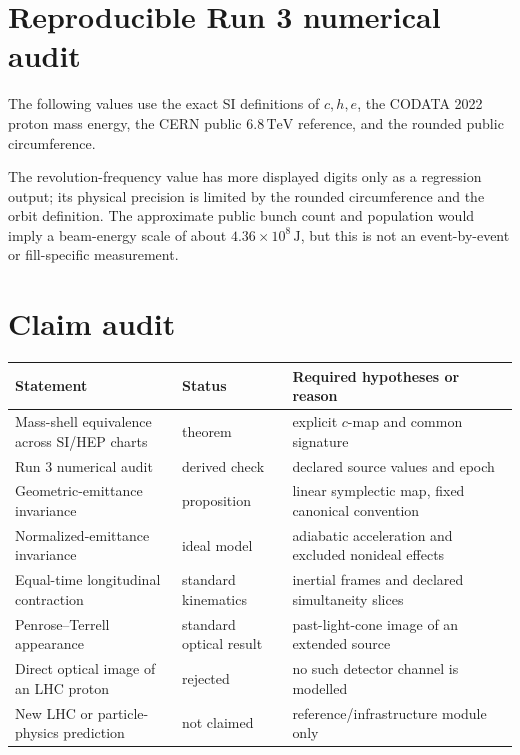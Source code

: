 \documentclass[11pt,a4paper]{article}
\theoremstyle{definition}
\theoremstyle{plain}
\theoremstyle{remark}
\newcommand{\TeV}{\mathrm{TeV}}
\begin{document}
\section{Reproducible Run 3 numerical audit}

The following values use the exact SI definitions of \(c,h,e\), the
CODATA 2022 proton mass energy, the CERN public \(6.8\,\TeV\)
reference, and the rounded public circumference.

\begin{center}
\small

\end{center}

The revolution-frequency value has more displayed digits only as a
regression output; its physical precision is limited by the rounded
circumference and the orbit definition. The approximate public bunch
count and population would imply a beam-energy scale of about
\(4.36\times10^8\,\mathrm J\), but this is not an event-by-event or
fill-specific measurement.

\section{Claim audit}

\begin{center}
\begin{tabularx}{\linewidth}{@{}L{49mm}L{27mm}Y@{}}
\toprule
Statement & Status & Required hypotheses or reason \\
\midrule
Mass-shell equivalence across SI/HEP charts & theorem & explicit \(c\)-map and common signature \\
Run 3 numerical audit & derived check & declared source values and epoch \\
Geometric-emittance invariance & proposition & linear symplectic map, fixed canonical convention \\
Normalized-emittance invariance & ideal model & adiabatic acceleration and excluded nonideal effects \\
Equal-time longitudinal contraction & standard kinematics & inertial frames and declared simultaneity slices \\
Penrose--Terrell appearance & standard optical result & past-light-cone image of an extended source \\
Direct optical image of an LHC proton & rejected & no such detector channel is modelled \\
New LHC or particle-physics prediction & not claimed & reference/infrastructure module only \\
\bottomrule
\end{tabularx}
\end{center}
\end{document}
